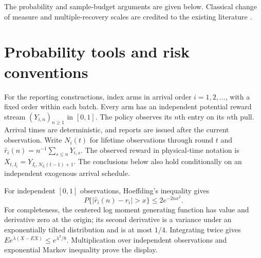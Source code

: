 \documentclass[11pt]{article}
\theoremstyle{remark}
\begin{document}
The probability and sample-budget arguments are given below. Classical
change of measure and multiple-recovery scales are credited to the existing
literature \citep{kaufmann2016,malloy2014,jamieson2018,mason2020}.


\makeatletter
\renewcommand{\@pnumwidth}{2.8em}
\renewcommand{\@tocrmarg}{3.8em}
\renewcommand{\l@section}{\@dottedtocline{1}{0em}{3em}}
\renewcommand{\l@subsection}{\@dottedtocline{2}{1.5em}{4em}}
\renewcommand{\l@subsubsection}{\@dottedtocline{3}{3.8em}{5em}}
\makeatother
\renewcommand{\contentsname}{Supplementary contents}
\tableofcontents
\medskip
\section{Probability tools and risk conventions}
\label{app:tools}

For the reporting constructions, index arms in arrival order
$i=1,2,\ldots$, with a fixed order within each batch.
Every arm has an independent potential reward stream $(Y_{i,n})_{n\ge1}$
in $[0,1]$. The policy observes its $n$th entry on its $n$th pull. Arrival
times are deterministic, and reports are issued after the current observation.
Write $N_i(t)$ for lifetime observations through round $t$ and
$\hat r_i(n)=n^{-1}\sum_{s\le n}Y_{i,s}$. The observed reward in physical-time notation is
$X_{t,I_t}=Y_{I_t,N_{I_t}(t-1)+1}$. The conclusions below also
hold conditionally on an independent exogenous arrival schedule.

For independent $[0,1]$ observations, Hoeffding's inequality gives
\[
 P\{|\hat r_i(n)-r_i|>x\}\le2e^{-2nx^2}.
\]
For completeness, the centered log moment generating function has value and
derivative zero at the origin; its second derivative is a variance under an
exponentially tilted distribution and is at most $1/4$. Integrating twice
gives $Ee^{\lambda(X-EX)}\le e^{\lambda^2/8}$. Multiplication over independent
observations and exponential Markov inequality prove the display.
\end{document}
